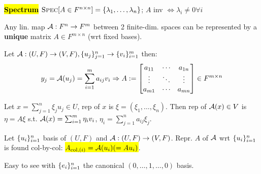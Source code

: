 \begin{Definition}
\textbf{\hl{Spectrum}} $\textsc{Spec}[A\in F^{n\times n}]=\{\lambda_1,\ldots,\lambda_n\}$; $A$ inv $\Leftrightarrow\lambda_i\ne 0\forall i$
\end{Definition}
\begin{Theorem}
Any lin. map $\mathcal{A}:F^n\to F^m$ between 2 finite-dim. spaces can be represented by a \textbf{unique} matrix $A\in F^{m\times n}$ (wrt fixed bases).
\end{Theorem}
Let $\mathcal{A}:(U,F)\to(V,F),\{u_{j}\}_{j=1}^{n}\to\{v_{i}\}_{i=1}^{m}$ then:
\vspace{-1mm}
\begin{equation*}
y_j=\mathcal{A}(u_j)=\sum_{i=1}^m{a_{ij}v_i}
\Rightarrow A:=\begin{bmatrix}
a_{11}&\cdots&a_{1n}\\
\vdots&\ddots&\vdots\\
a_{m1}&\cdots&a_{mn}
\end{bmatrix}\in F^{m\times n}
\end{equation*}
\begin{Fact}
Let $x=\sum_{j=1}^n\xi_ju_j\in U$, rep of $x$ is $\xi=(\xi_1,\ldots,\xi_n)$. Then rep of $\mathcal{A}(x)\in V$ is $\eta=A\xi$ s.t. $\mathcal{A}(x)=\sum_{i=1}^m\eta_iv_i$, $\eta_i=\sum_{j=1}^n{a_{ij}\xi_j}$.
\end{Fact}
Let $\{u_{i}\}_{i=1}^{n}$ basis of $(U,F)$ and $\mathcal{A}:(U,F)\to(V,F)$. Repr. $A$ of $\mathcal{A}$ wrt $\{u_{i}\}_{i=1}^{n}$ is found col-by-col: \hl{$A_{\text{col,}(i)}=\mathcal{A}(u_i)(=Au_i)$}.

Easy to see with $\{e_{i}\}_{i=1}^{n}$ the canonical $(0,\ldots,1,\ldots,0)$ basis.


